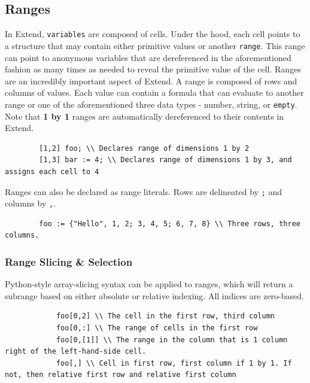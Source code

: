 	\subsection{Ranges}
	In Extend, \texttt{variables} are composed of cells. Under the hood, each cell points to a structure that may contain either primitive values or another \texttt{range}. This range can point to anonymous variables that are dereferenced in the aforementioned fashion as many times as needed to reveal the primitive value of the cell.
	\newline \newline
	Ranges are an incredibly important aspect of Extend. A range is composed of rows and columns of values.
	Each value can contain a formula that can evaluate to another range or one of the aforementioned three data types - number, string, or \texttt{empty}. Note that \textbf{1 by 1} ranges are automatically dereferenced to their contents in Extend.

	\begin{lstlisting}
		[1,2] foo; \\ Declares range of dimensions 1 by 2
		[1,3] bar := 4; \\ Declares range of dimensions 1 by 3, and assigns each cell to 4
	\end{lstlisting}

	\medskip \noindent
	Ranges can also be declared as range literals. Rows are delineated by \texttt{;} and columns by \texttt{,}.

	\begin{lstlisting}
		foo := {"Hello", 1, 2; 3, 4, 5; 6, 7, 8} \\ Three rows, three columns.
	\end{lstlisting}

		\subsubsection{Range Slicing \& Selection}
		Python-style array-slicing syntax can be applied to ranges, which will return a subrange based on either absolute or relative indexing. All indices are zero-based.

		\begin{lstlisting}
			foo[0,2] \\ The cell in the first row, third column
			foo[0,:] \\ The range of cells in the first row
			foo[0,[1]] \\ The range in the column that is 1 column right of the left-hand-side cell.
			foo[,] \\ Cell in first row, first column if 1 by 1. If not, then relative first row and relative first column
		\end{lstlisting}

